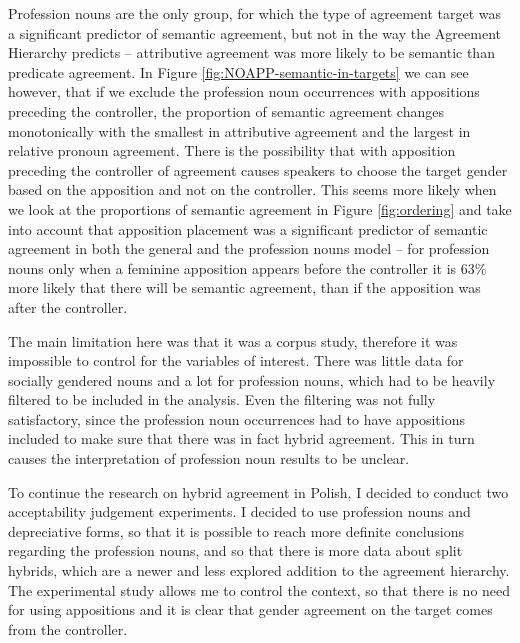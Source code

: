 Profession nouns are the only group, for which the type of agreement target was a significant predictor of semantic agreement, but not in the way the Agreement Hierarchy predicts -- attributive agreement was more likely to be semantic than predicate agreement. In Figure \ref{fig:NOAPP-semantic-in-targets} we can see however, that if we exclude the profession noun occurrences with appositions preceding the controller, the proportion of semantic agreement changes monotonically with the smallest in attributive agreement and the largest in relative pronoun agreement. There is the possibility that with apposition preceding the controller of agreement causes speakers to choose the target gender based on the apposition and not on the controller. This seems more likely when we look at the proportions of semantic agreement in Figure \ref{fig:ordering} and take into account that apposition placement was a significant predictor of semantic agreement in both the general and the profession nouns model -- for profession nouns only when a feminine apposition appears before the controller it is 63\% more likely that there will be semantic agreement, than if the apposition was after the controller.

The main limitation here was that it was a corpus study, therefore it was impossible to control for the variables of interest. There was little data for socially gendered nouns and a lot for profession nouns, which had to be heavily filtered to be included in the analysis. Even the filtering was not fully satisfactory, since the profession noun occurrences had to have appositions included to make sure that there was in fact hybrid agreement. This in turn causes the interpretation of profession noun results to be unclear.

To continue the research on hybrid agreement in Polish, I decided to conduct two acceptability judgement experiments. I decided to use profession nouns and depreciative forms, so that it is possible to reach more definite conclusions regarding the profession nouns, and so that there is more data about split hybrids, which are a newer and less explored addition to the agreement hierarchy. The experimental study allows me to control the context, so that there is no need for using appositions and it is clear that gender agreement on the target comes from the controller.
